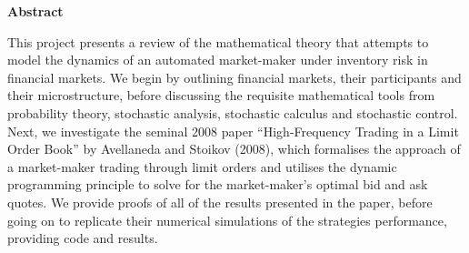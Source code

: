 \thispagestyle{plain}
\mbox{}
\vspace{60mm}
\begin{center}
    \textbf{Abstract}
\end{center}
This project presents a review of the mathematical theory that attempts to model the 
dynamics of an automated market-maker under inventory risk in financial markets. We 
begin by outlining financial markets, their participants and their microstructure, 
before discussing the requisite mathematical tools from probability theory, stochastic 
analysis, stochastic calculus and stochastic control. Next, we investigate the seminal 
2008 paper ``High-Frequency Trading in a Limit Order Book'' by Avellaneda and Stoikov 
(2008), which formalises the approach of a market-maker trading through limit orders 
and utilises the dynamic programming principle to solve for the market-maker's optimal 
bid and ask quotes. We provide proofs of all of the results presented in the paper,
before going on to replicate their numerical simulations of the strategies performance,
providing code and results. 
\newpage